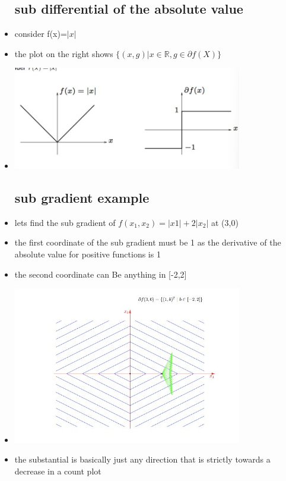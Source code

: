 \documentclass{article}
\begin{document}
\begin{itemize}
\subsection{sub differential of the absolute value}
\item consider f(x)=$|x|$
\item the plot on the right shows $\{(x,g)|x\in\mathbb{R}, g\in \partial f(X)\}$
\item \includegraphics[width=10cm]{lecture_notes/lecture_4/immmages/l4_10.jpg}
\subsection{sub gradient example}
\item lets find the sub gradient of $f(x_1,x_2)=|x1|+2|x_2|$ at (3,0)
\item the first coordinate of the sub gradient must be 1 as the derivative of the absolute value for positive functions is 1 
\item the second coordinate can Be anything in [-2,2]
\item \includegraphics[width=10cm]{lecture_notes/lecture_4/immmages/l4_11.jpg}
\item the substantial is basically just any direction that is strictly towards a decrease in a count plot

\end{itemize}
\end{document}
